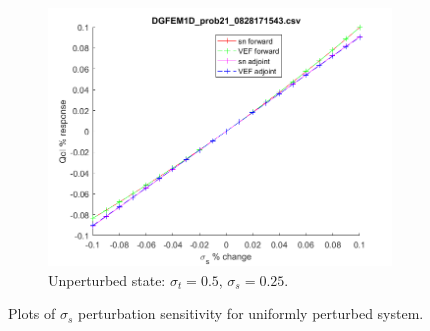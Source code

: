 \documentclass{article}
\newcommand{\sigt}{\sigma_t}
\newcommand{\sigs}{\sigma_s}
\begin{document}
\begin{figure}[H]
\begin{subfigure}{.65\textwidth}
  \centering
  \includegraphics[width=.98\linewidth]{figures/21sigsSens.png}
  \caption{Unperturbed state: $\sigt=0.5$, $\sigs=0.25$.}
  \label{fig:sfig3}
\end{subfigure}
\caption{Plots of $\sigs$ perturbation sensitivity for uniformly perturbed system.}
\label{fig:fig}
\end{figure}
\end{document}
